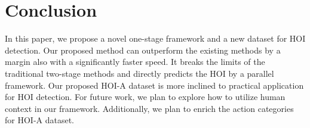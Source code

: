 \documentclass[10pt,twocolumn,letterpaper]{article}
\begin{document}
\vspace{-3mm}
\section{Conclusion}
\vspace{-2mm}
In this paper, we propose a novel one-stage framework and a new dataset for HOI detection. Our proposed method can outperform the existing methods by a margin also with a significantly faster speed. It breaks the limits of the traditional two-stage methods and directly predicts the HOI by a parallel framework. Our proposed HOI-A dataset is more inclined to practical application for HOI detection. For future work, we plan to explore how to utilize human context in our framework. Additionally, we plan to enrich the action categories for HOI-A dataset.


{\small


}
\end{document}

